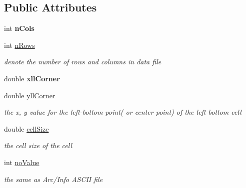 \subsection*{\-Public \-Attributes}
\begin{DoxyCompactItemize}
\item 
\hypertarget{structArcInfoASCIIGenerator_1_1FileHeader_a92571f6afaab2da4ffb03f8841aa1467}{int {\bfseries n\-Cols}}\label{structArcInfoASCIIGenerator_1_1FileHeader_a92571f6afaab2da4ffb03f8841aa1467}

\item 
\hypertarget{structArcInfoASCIIGenerator_1_1FileHeader_a00460ad3a53c48556aa7a7078faa42fa}{int \hyperlink{structArcInfoASCIIGenerator_1_1FileHeader_a00460ad3a53c48556aa7a7078faa42fa}{n\-Rows}}\label{structArcInfoASCIIGenerator_1_1FileHeader_a00460ad3a53c48556aa7a7078faa42fa}

\begin{DoxyCompactList}\small\item\em denote the number of rows and columns in data file \end{DoxyCompactList}\item 
\hypertarget{structArcInfoASCIIGenerator_1_1FileHeader_a61c3e83931884a290ab7e8b5370ff98f}{double {\bfseries xll\-Corner}}\label{structArcInfoASCIIGenerator_1_1FileHeader_a61c3e83931884a290ab7e8b5370ff98f}

\item 
\hypertarget{structArcInfoASCIIGenerator_1_1FileHeader_a6a477f07548715d424bc7d6dc04b4c7e}{double \hyperlink{structArcInfoASCIIGenerator_1_1FileHeader_a6a477f07548715d424bc7d6dc04b4c7e}{yll\-Corner}}\label{structArcInfoASCIIGenerator_1_1FileHeader_a6a477f07548715d424bc7d6dc04b4c7e}

\begin{DoxyCompactList}\small\item\em the x, y value for the left-\/bottom point( or center point) of the left bottom cell \end{DoxyCompactList}\item 
\hypertarget{structArcInfoASCIIGenerator_1_1FileHeader_a765a78b8364c349bf7f956a8082d93ca}{double \hyperlink{structArcInfoASCIIGenerator_1_1FileHeader_a765a78b8364c349bf7f956a8082d93ca}{cell\-Size}}\label{structArcInfoASCIIGenerator_1_1FileHeader_a765a78b8364c349bf7f956a8082d93ca}

\begin{DoxyCompactList}\small\item\em the cell size of the cell \end{DoxyCompactList}\item 
\hypertarget{structArcInfoASCIIGenerator_1_1FileHeader_a0e2ab90e13dd7ab96688c08da388a307}{int \hyperlink{structArcInfoASCIIGenerator_1_1FileHeader_a0e2ab90e13dd7ab96688c08da388a307}{no\-Value}}\label{structArcInfoASCIIGenerator_1_1FileHeader_a0e2ab90e13dd7ab96688c08da388a307}

\begin{DoxyCompactList}\small\item\em the same as \-Arc/\-Info \-A\-S\-C\-I\-I file \end{DoxyCompactList}\end{DoxyCompactItemize}
